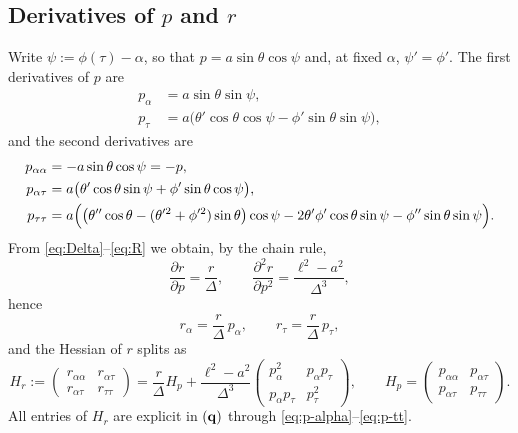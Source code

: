 \documentclass[10pt, a4paper]{article}
\begin{document}
\subsection[Derivatives of p and r]{Derivatives of $p$ and $r$}

Write $\psi := \phi(\tau) - \alpha$, so that $p = a\sin\theta\cos\psi$ and,
at fixed $\alpha$, $\psi' = \phi'$.  The first derivatives of $p$ are
\begin{align}
    p_\alpha &= a \sin\theta \sin\psi,
    \label{eq:p-alpha}\\
    p_\tau &= a \bigl( \theta'\cos\theta\cos\psi
    - \phi'\sin\theta\sin\psi \bigr),
    \label{eq:p-tau}
\end{align}
and the second derivatives are
\begin{align}
    p_{\alpha\alpha} &= -a\sin\theta\cos\psi = -p,
    \label{eq:p-aa}\\
    p_{\alpha\tau} &= a \bigl( \theta'\cos\theta\sin\psi
    + \phi'\sin\theta\cos\psi \bigr),
    \label{eq:p-at}\\
    p_{\tau\tau} &= a \Bigl(
    \bigl( \theta''\cos\theta - (\theta'^2 + \phi'^2)\sin\theta \bigr)\cos\psi
    - 2\theta'\phi'\cos\theta\sin\psi
    - \phi''\sin\theta\sin\psi
    \Bigr).
    \label{eq:p-tt}
\end{align}
From \eqref{eq:Delta}--\eqref{eq:R} we obtain, by the chain rule,
\begin{equation} \label{eq:R-derivatives}
    \frac{\partial r}{\partial p} = \frac{r}{\Delta},
    \qquad
    \frac{\partial^2 r}{\partial p^2} = \frac{\ell^2 - a^2}{\Delta^3},
\end{equation}
hence
\begin{equation} \label{eq:R-grad}
    r_\alpha = \frac{r}{\Delta}\, p_\alpha,
    \qquad
    r_\tau = \frac{r}{\Delta}\, p_\tau,
\end{equation}
and the Hessian of $r$ splits as
\begin{equation} \label{eq:R-hessian}
    H_r
    := \begin{pmatrix} r_{\alpha\alpha} & r_{\alpha\tau} \\
        r_{\alpha\tau} & r_{\tau\tau} \end{pmatrix}
    = \frac{r}{\Delta} H_p
    + \frac{\ell^2 - a^2}{\Delta^3}
    \begin{pmatrix} p_\alpha^2 & p_\alpha p_\tau \\
        p_\alpha p_\tau & p_\tau^2 \end{pmatrix},
    \qquad
    H_p = \begin{pmatrix}
        p_{\alpha\alpha} & p_{\alpha\tau} \\
        p_{\alpha\tau} & p_{\tau\tau}
    \end{pmatrix}.
\end{equation}
All entries of $H_r$ are explicit in $(\vb q)$ through
\eqref{eq:p-alpha}--\eqref{eq:p-tt}.
\end{document}
